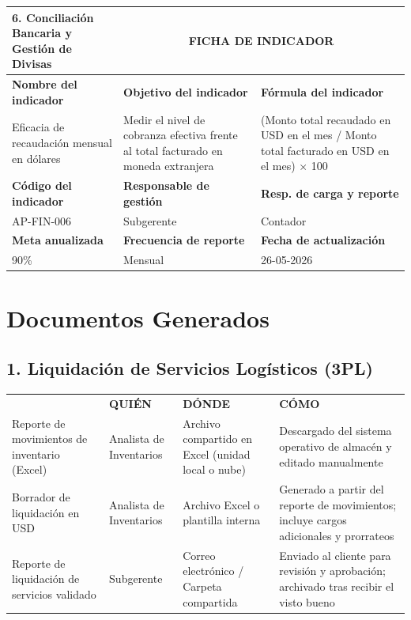 \documentclass[11pt,letterpaper]{report}
\newcommand{\fichaIndicador}[9]{
  \noindent
  \begin{tabularx}{\textwidth}{p{0.25\textwidth}XX}
  \toprule
  \textbf{#1} & \multicolumn{2}{c}{\textbf{FICHA DE INDICADOR}} \\
  \midrule
  \textbf{Nombre del indicador} & \textbf{Objetivo del indicador} & \textbf{Fórmula del indicador} \\
  #2 & #3 & #4 \\
  \midrule
  \textbf{Código del indicador} & \textbf{Responsable de gestión} & \textbf{Resp. de carga y reporte} \\
  #5 & #6 & #7 \\
  \midrule
  \textbf{Meta anualizada} & \textbf{Frecuencia de reporte} & \textbf{Fecha de actualización} \\
  #8 & #9 & 26-05-2026 \\
  \bottomrule
  \end{tabularx}
  \vspace{1.5em}
}
\begin{document}
\fichaIndicador{6. Conciliación Bancaria y Gestión de Divisas}{Eficacia de recaudación mensual en dólares}{Medir el nivel de cobranza efectiva frente al total facturado en moneda extranjera}{(Monto total recaudado en USD en el mes / Monto total facturado en USD en el mes) $\times$ 100}{AP-FIN-006}{Subgerente}{Contador}{90\%}{Mensual}

\newpage

\chapter{Documentos Generados}

\section*{1. Liquidación de Servicios Logísticos (3PL)}
\begin{tabularx}{\textwidth}{>{\raggedright\arraybackslash}X >{\raggedright\arraybackslash}p{} >{\raggedright\arraybackslash}p{} >{\raggedright\arraybackslash}X}
\toprule
\multirow{2}{*}{\textbf{DOCUMENTO (QUÉ)}} & \multicolumn{3}{c}{\textbf{CUSTODIA}} \\
\cmidrule{2-4}
& \textbf{QUIÉN} & \textbf{DÓNDE} & \textbf{CÓMO} \\
\midrule
Reporte de movimientos de inventario (Excel) & Analista de Inventarios & Archivo compartido en Excel (unidad local o nube) & Descargado del sistema operativo de almacén y editado manualmente \\
\midrule
Borrador de liquidación en USD & Analista de Inventarios & Archivo Excel o plantilla interna & Generado a partir del reporte de movimientos; incluye cargos adicionales y prorrateos \\
\midrule
Reporte de liquidación de servicios validado & Subgerente & Correo electrónico / Carpeta compartida & Enviado al cliente para revisión y aprobación; archivado tras recibir el visto bueno \\
\bottomrule
\end{tabularx}

\vspace{2em}

\end{document}
